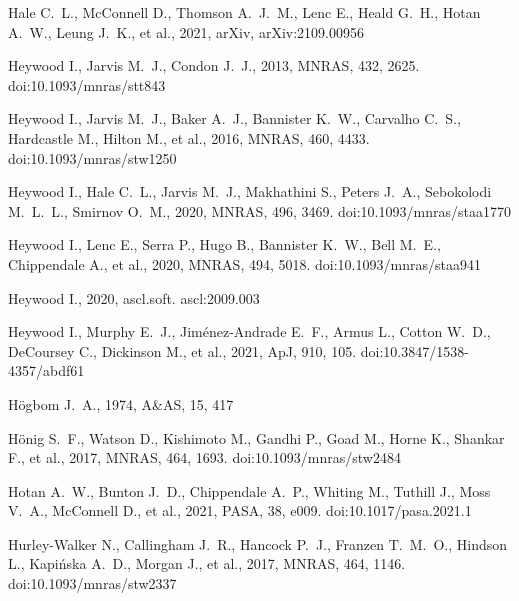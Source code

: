 \documentclass[usenatbib,usedcolumn]{mnras}
\begin{document}
\begin{thebibliography}{}
 Hale C.~L., McConnell D., Thomson A.~J.~M., Lenc E., Heald G.~H., Hotan A.~W., Leung J.~K., et al., 2021, arXiv, arXiv:2109.00956

 Heywood I., Jarvis M.~J., Condon J.~J., 2013, MNRAS, 432, 2625. doi:10.1093/mnras/stt843

 Heywood I., Jarvis M.~J., Baker A.~J., Bannister K.~W., Carvalho C.~S., Hardcastle M., Hilton M., et al., 2016, MNRAS, 460, 4433. doi:10.1093/mnras/stw1250

 Heywood I., Hale C.~L., Jarvis M.~J., Makhathini S., Peters J.~A., Sebokolodi M.~L.~L., Smirnov O.~M., 2020, MNRAS, 496, 3469. doi:10.1093/mnras/staa1770

 Heywood I., Lenc E., Serra P., Hugo B., Bannister K.~W., Bell M.~E., Chippendale A., et al., 2020, MNRAS, 494, 5018. doi:10.1093/mnras/staa941

 Heywood I., 2020, ascl.soft. ascl:2009.003

 Heywood I., Murphy E.~J., Jim{\'e}nez-Andrade E.~F., Armus L., Cotton W.~D., DeCoursey C., Dickinson M., et al., 2021, ApJ, 910, 105. doi:10.3847/1538-4357/abdf61

 H{\"o}gbom J.~A., 1974, A\&AS, 15, 417

 H{\"o}nig S.~F., Watson D., Kishimoto M., Gandhi P., Goad M., Horne K., Shankar F., et al., 2017, MNRAS, 464, 1693. doi:10.1093/mnras/stw2484

 Hotan A.~W., Bunton J.~D., Chippendale A.~P., Whiting M., Tuthill J., Moss V.~A., McConnell D., et al., 2021, PASA, 38, e009. doi:10.1017/pasa.2021.1


 Hurley-Walker N., Callingham J.~R., Hancock P.~J., Franzen T.~M.~O., Hindson L., Kapi{\'n}ska A.~D., Morgan J., et al., 2017, MNRAS, 464, 1146. doi:10.1093/mnras/stw2337


\end{thebibliography}
\end{document}
